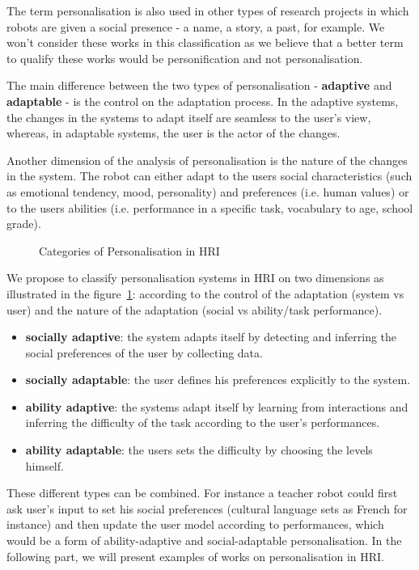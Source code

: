 \documentclass[a4paper,twocolumn]{svjour3}
\begin{document}
The term personalisation is also used in other types of research projects in which robots are given a social presence - a name, a story, a past, for example. 
We won't consider these works in this classification as we believe that a better term to qualify these works would be personification and not personalisation. 


The main difference between the two types of personalisation - \textbf{adaptive} and \textbf{adaptable} - is the control on the adaptation process. 
In the adaptive systems, the changes in the systems to adapt itself are seamless to the user's view, whereas, in adaptable systems, the user is the actor of the changes. 

Another dimension of the analysis of personalisation is the nature of the changes in the system. 
The robot can either adapt to the users social characteristics (such as emotional tendency, mood, personality) and preferences (i.e. human values) or to the users abilities (i.e. performance in a specific task, vocabulary to age, school grade).
\begin{figure}[h]
	\centering
	\caption{Categories of Personalisation in HRI}
	\label{fig:personalisation}
\end{figure}
We propose to classify personalisation systems in HRI on two dimensions as illustrated in the figure~\ref{fig:personalisation}: according to the control of the adaptation (system vs user) and the nature of the adaptation (social vs ability/task performance).

\begin{itemize}[noitemsep,nolistsep]
	\item \textbf{socially adaptive}: the system adapts itself by detecting and inferring the social preferences of the user by collecting data.
	\item \textbf{socially adaptable}: the user defines his preferences explicitly to the system. 
	\item \textbf{ability adaptive}: the systems adapt itself by learning from interactions and inferring the difficulty of the task according to the user's performances.
	\item \textbf{ability adaptable}: the users sets the difficulty by choosing the levels himself.
\end{itemize}
These different types can be combined.
For instance a teacher robot could first ask user's input to set his social preferences (cultural language sets as French for instance) and then update the user model according to performances, which would be a form of ability-adaptive and social-adaptable personalisation.
In the following part, we will present examples of works on personalisation in HRI. 
\end{document}
